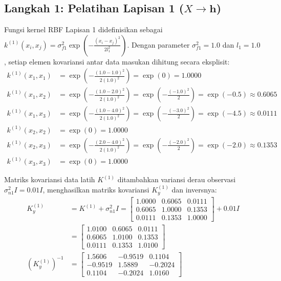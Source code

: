 \documentclass[11pt,a4paper]{article}
\begin{document}
\subsection{Langkah 1: Pelatihan Lapisan 1 (\texorpdfstring{$X \to \mathbf{h}$}{X -> h})}
Fungsi kernel RBF Lapisan 1 didefinisikan sebagai $k^{(1)}(x_i, x_j) = \sigma_{f1}^2 \exp\left(-\frac{(x_i - x_j)^2}{2l_1^2}\right)$. Dengan parameter $\sigma_{f1}^2 = 1.0$ dan $l_1 = 1.0$, setiap elemen kovariansi antar data masukan dihitung secara eksplisit:
\begin{align*}
k^{(1)}(x_1, x_1) &= \exp\left(-\frac{(1.0 - 1.0)^2}{2(1.0)^2}\right) = \exp(0) = 1.0000 \\
k^{(1)}(x_1, x_2) &= \exp\left(-\frac{(1.0 - 2.0)^2}{2(1.0)^2}\right) = \exp\left(-\frac{(-1.0)^2}{2}\right) = \exp(-0.5) \approx 0.6065 \\
k^{(1)}(x_1, x_3) &= \exp\left(-\frac{(1.0 - 4.0)^2}{2(1.0)^2}\right) = \exp\left(-\frac{(-3.0)^2}{2}\right) = \exp(-4.5) \approx 0.0111 \\
k^{(1)}(x_2, x_2) &= \exp(0) = 1.0000 \\
k^{(1)}(x_2, x_3) &= \exp\left(-\frac{(2.0 - 4.0)^2}{2(1.0)^2}\right) = \exp\left(-\frac{(-2.0)^2}{2}\right) = \exp(-2.0) \approx 0.1353 \\
k^{(1)}(x_3, x_3) &= \exp(0) = 1.0000
\end{align*}

Matriks kovariansi data latih $K^{(1)}$ ditambahkan variansi derau observasi $\sigma_{n1}^2 I = 0.01 I$, menghasilkan matriks kovariansi $K_y^{(1)}$ dan inversnya:
\begin{align}
K_y^{(1)} &= K^{(1)} + \sigma_{n1}^2 I = \begin{bmatrix} 1.0000 & 0.6065 & 0.0111 \\ 0.6065 & 1.0000 & 0.1353 \\ 0.0111 & 0.1353 & 1.0000 \end{bmatrix} + 0.01 I \nonumber \\
&= \begin{bmatrix} 1.0100 & 0.6065 & 0.0111 \\ 0.6065 & 1.0100 & 0.1353 \\ 0.0111 & 0.1353 & 1.0100 \end{bmatrix} \\
(K_y^{(1)})^{-1} &= \begin{bmatrix} 1.5606 & -0.9519 & 0.1104 \\ -0.9519 & 1.5889 & -0.2024 \\ 0.1104 & -0.2024 & 1.0160 \end{bmatrix}
\end{align}
\end{document}

